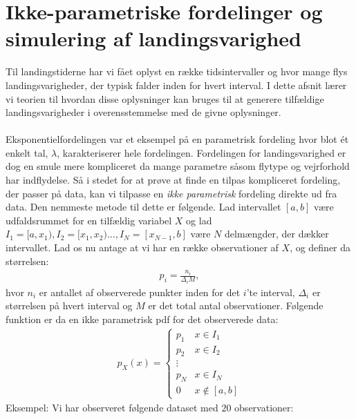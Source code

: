 \documentclass{article}
\begin{document}
\section{Ikke-parametriske fordelinger og simulering af landings\-varig\-hed}
Til landingstiderne har vi fået oplyst en række tidsintervaller og hvor mange flys landingsvarigheder, der typisk falder inden for hvert interval. I dette afsnit lærer vi teorien til hvordan disse oplysninger kan bruges til at generere tilfældige landingsvarigheder i overensstemmelse med de givne oplysninger.  
\\ \\
Eksponentielfordelingen var et eksempel på en parametrisk fordeling hvor blot ét enkelt tal, $\lambda$, karakteriserer hele fordelingen. Fordelingen for landingsvarighed er dog en smule mere kompliceret da mange parametre såsom flytype og vejrforhold har indflydelse. Så i stedet for at prøve at finde en tilpas kompliceret fordeling, der passer på data, kan vi tilpasse en \textit{ikke parametrisk} fordeling direkte ud fra data. Den nemmeste metode til dette er følgende. Lad intervallet $[a,b]$ være udfaldsrummet for en tilfældig variabel $X$ og lad $I_1 = [a,x_1), I_2 = [x_1,x_2)\dots, I_N = [x_{N-1},b]$ være $N$ delmængder, der dækker intervallet. Lad os nu antage at vi har en række observationer af $X$, og definer da størrelsen:
\begin{align*}
p_i = \frac{n_i}{\Delta_iM},
\end{align*}
hvor $n_i$ er antallet af observerede punkter inden for det $i$'te interval, $\Delta_i$ er størrelsen på hvert interval og $M$ er det total antal observationer. Følgende funktion er da en ikke parametrisk pdf for det observerede data:
\begin{align*}
p_X(x) = \begin{cases}
p_1 & x \in I_1 \\
p_2 & x \in I_2 \\
\vdots \\
p_N & x \in I_N \\
0 & x \notin [a,b]
\end{cases}
\end{align*}
Eksempel: Vi har observeret følgende dataset med $20$ observationer:
\end{document}
